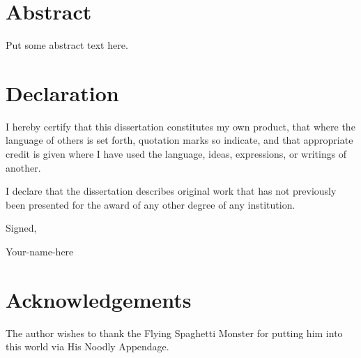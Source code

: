 \documentclass[a4paper,10pt,oneside]{book}
\begin{document}


\frontmatter


\doublespacing

\setlength{\parindent}{0in}
\setlength{\parskip}{10pt} 


\chapter{Abstract}

Put some abstract text here.


\chapter{Declaration}

I hereby certify that this dissertation constitutes my own product, that where the language of others is set forth, quotation marks so indicate, and that appropriate credit is given where I have used the language, ideas, expressions, or writings of another.

I declare that the dissertation describes original work that has not previously been presented for the award of any other degree of any institution.

Signed,

Your-name-here


\chapter{Acknowledgements}


The author wishes to thank the Flying Spaghetti Monster for putting him into this world via His Noodly Appendage.



\setlength{\parskip}{0pt} 


\tableofcontents



\listoftables

\listoffigures


\setlength{\parskip}{10pt} 


\mainmatter





\singlespacing


\end{document}
